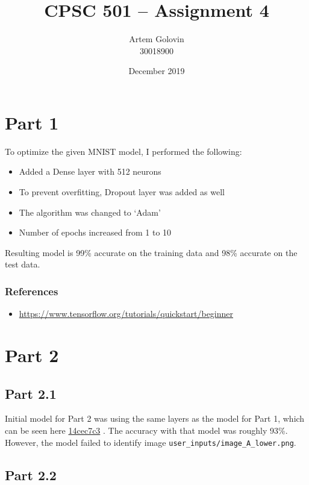 \documentclass{article}
\title{CPSC 501 -- Assignment 4}
\author{Artem Golovin \\ 30018900}
\date{December 2019}
\newcommand{\gh}[1]{%
  \href{https://github.com/awave1/cpsc501-tensorflow/commit/#1}{#1}%
}
\begin{document}
\maketitle

\section*{Part 1}

To optimize the given MNIST model, I performed the following:

\begin{itemize}
  \item Added a Dense layer with 512 neurons
  \item To prevent overfitting, Dropout layer was added as well
  \item The algorithm was changed to `Adam'
  \item Number of epochs increased from 1 to 10
\end{itemize}

Resulting model is 99\% accurate on the training data and 98\% accurate on the test data.

\subsubsection*{References}

\begin{itemize}
  \item \href{https://www.tensorflow.org/tutorials/quickstart/beginner}{https://www.tensorflow.org/tutorials/quickstart/beginner}
\end{itemize}

\section*{Part 2}

\subsection*{Part 2.1}

Initial model for Part 2 was using the same layers as the model for Part 1, which can be seen here \gh{14cec7c3}. The accuracy with that model was roughly 93\%. However, the model failed to identify image \texttt{user\_inputs/image\_A\_lower.png}.

\subsection*{Part 2.2}
\end{document}
